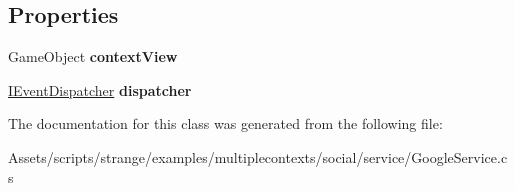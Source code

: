 \subsection*{Properties}
\begin{DoxyCompactItemize}
\item 
\hypertarget{classstrange_1_1examples_1_1multiplecontexts_1_1social_1_1_google_service_a862cc973fbd0e3978ba1ddbe8186b52c}{Game\-Object {\bfseries context\-View}}\label{classstrange_1_1examples_1_1multiplecontexts_1_1social_1_1_google_service_a862cc973fbd0e3978ba1ddbe8186b52c}

\item 
\hypertarget{classstrange_1_1examples_1_1multiplecontexts_1_1social_1_1_google_service_aa71667ee515f0d124b22eda2f3bd2507}{\hyperlink{interfacestrange_1_1extensions_1_1dispatcher_1_1eventdispatcher_1_1api_1_1_i_event_dispatcher}{I\-Event\-Dispatcher} {\bfseries dispatcher}}\label{classstrange_1_1examples_1_1multiplecontexts_1_1social_1_1_google_service_aa71667ee515f0d124b22eda2f3bd2507}

\end{DoxyCompactItemize}


The documentation for this class was generated from the following file\-:\begin{DoxyCompactItemize}
\item 
Assets/scripts/strange/examples/multiplecontexts/social/service/Google\-Service.\-cs\end{DoxyCompactItemize}
